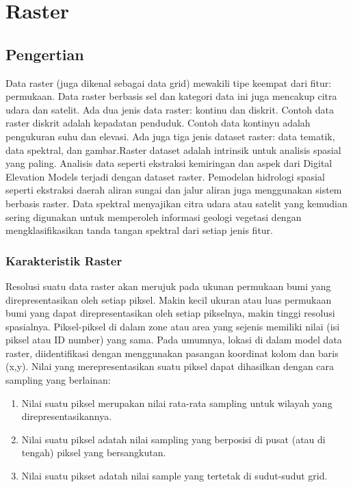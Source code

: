 \section{Raster}
 \subsection{Pengertian}
Data raster (juga dikenal sebagai data grid) mewakili tipe keempat dari fitur: permukaan. 
Data raster berbasis sel dan kategori data ini juga mencakup citra udara dan satelit. 
Ada dua jenis data raster: kontinu dan diskrit. Contoh data raster diskrit adalah kepadatan penduduk. 
Contoh data kontinyu adalah pengukuran suhu dan elevasi. Ada juga tiga jenis dataset raster: data tematik, 
data spektral, dan gambar.Raster dataset adalah intrinsik untuk analisis spasial yang paling. 
Analisis data seperti ekstraksi kemiringan dan aspek dari Digital Elevation Models terjadi dengan dataset raster.
Pemodelan hidrologi spasial seperti ekstraksi daerah aliran sungai dan jalur aliran juga menggunakan sistem berbasis raster.
Data spektral menyajikan citra udara atau satelit yang kemudian sering digunakan 
untuk memperoleh informasi geologi vegetasi dengan mengklasifikasikan tanda tangan spektral dari setiap jenis fitur.

\subsubsection{Karakteristik Raster}
Resolusi suatu data raster akan merujuk pada ukunan permukaan bumi yang direpresentasikan oleh setiap piksel. 
Makin kecil ukuran atau luas permukaan bumi yang dapat direpresentasikan oleh setiap pikselnya, makin tinggi resolusi spasialnya.
Piksel-piksel di dalam zone atau area yang sejenis memiliki nilai (isi piksel atau ID number) yang sama.
Pada umumnya, lokasi di dalam model data raster, diidentifikasi dengan menggunakan pasangan koordinat kolom dan baris (x,y).
Nilai yang merepresentasikan suatu piksel dapat dihasilkan dengan cara sampling yang berlainan:
\begin{enumerate}
\item Nilai suatu piksel merupakan nilai rata-rata sampling untuk wilayah yang direpresentasikannya.
\item Nilai suatu piksel adatah nilai sampling yang berposisi di pusat (atau di tengah) piksel yang bersangkutan.
\item Nilai suatu pikset adatah nilai sample yang tertetak di sudut-sudut grid.
\end{enumerate}

